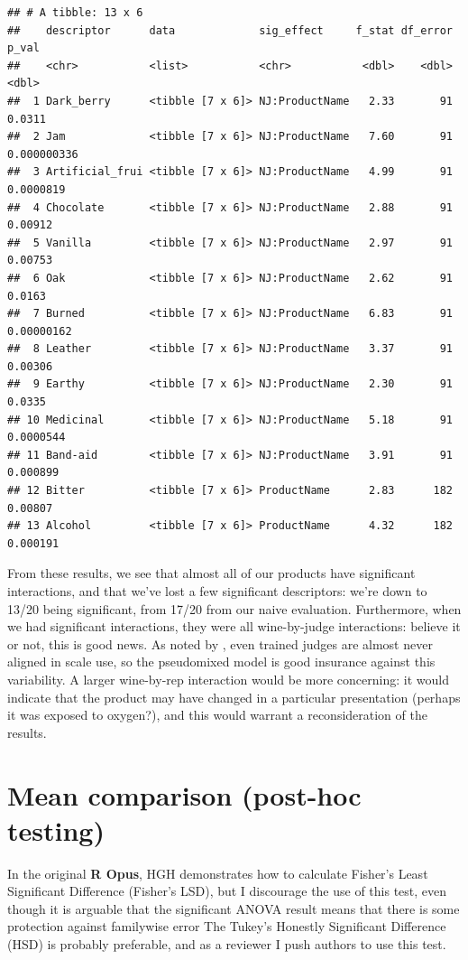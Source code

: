 \documentclass[
]{book}
\begin{document}
\begin{verbatim}
## # A tibble: 13 x 6
##    descriptor      data             sig_effect     f_stat df_error       p_val
##    <chr>           <list>           <chr>           <dbl>    <dbl>       <dbl>
##  1 Dark_berry      <tibble [7 x 6]> NJ:ProductName   2.33       91 0.0311     
##  2 Jam             <tibble [7 x 6]> NJ:ProductName   7.60       91 0.000000336
##  3 Artificial_frui <tibble [7 x 6]> NJ:ProductName   4.99       91 0.0000819  
##  4 Chocolate       <tibble [7 x 6]> NJ:ProductName   2.88       91 0.00912    
##  5 Vanilla         <tibble [7 x 6]> NJ:ProductName   2.97       91 0.00753    
##  6 Oak             <tibble [7 x 6]> NJ:ProductName   2.62       91 0.0163     
##  7 Burned          <tibble [7 x 6]> NJ:ProductName   6.83       91 0.00000162 
##  8 Leather         <tibble [7 x 6]> NJ:ProductName   3.37       91 0.00306    
##  9 Earthy          <tibble [7 x 6]> NJ:ProductName   2.30       91 0.0335     
## 10 Medicinal       <tibble [7 x 6]> NJ:ProductName   5.18       91 0.0000544  
## 11 Band-aid        <tibble [7 x 6]> NJ:ProductName   3.91       91 0.000899   
## 12 Bitter          <tibble [7 x 6]> ProductName      2.83      182 0.00807    
## 13 Alcohol         <tibble [7 x 6]> ProductName      4.32      182 0.000191
\end{verbatim}

From these results, we see that almost all of our products have significant interactions, and that we've lost a few significant descriptors: we're down to 13/20 being significant, from 17/20 from our naive evaluation. Furthermore, when we had significant interactions, they were all wine-by-judge interactions: believe it or not, this is good news. As noted by \citet{brockhoffTaking2015}, even trained judges are almost never aligned in scale use, so the pseudomixed model is good insurance against this variability. A larger wine-by-rep interaction would be more concerning: it would indicate that the product may have changed in a particular presentation (perhaps it was exposed to oxygen?), and this would warrant a reconsideration of the results.

\section{Mean comparison (post-hoc testing)}\label{mean-comparison-post-hoc-testing}

In the original \textbf{R Opus}, HGH demonstrates how to calculate Fisher's Least Significant Difference (Fisher's LSD), but I discourage the use of this test, even though it is arguable that the significant ANOVA result means that there is some protection against familywise error \citet{rencherMethods2002} The Tukey's Honestly Significant Difference (HSD) is probably preferable, and as a reviewer I push authors to use this test.
\end{document}
